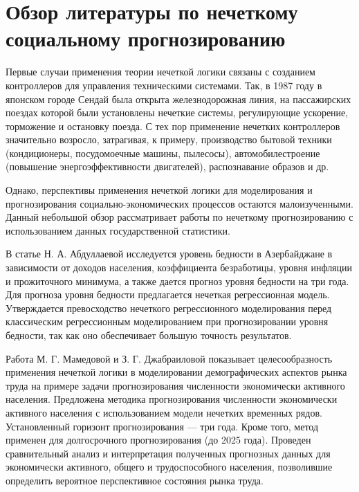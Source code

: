 \section{Обзор литературы по нечеткому социальному прогнозированию}

Первые случаи применения теории нечеткой логики связаны с созданием контроллеров
для управления техническими системами. Так, в 1987 году в японском городе Сендай
была открыта железнодорожная линия, на пассажирских поездах которой были
установлены нечеткие системы, регулирующие ускорение, торможение и остановку
поезда. С тех пор применение нечетких контроллеров значительно возросло,
затрагивая, к примеру, производство бытовой техники (кондиционеры, посудомоечные
машины, пылесосы), автомобилестроение (повышение энергоэффективности
двигателей), распознавание образов и др.

Однако, перспективы применения нечеткой логики для моделирования и
прогнозирования социально-экономических процессов остаются малоизученными.
Данный небольшой обзор рассматривает работы по нечеткому прогнозированию с
использованием данных государственной статистики. 

В статье  Н. А. Абдуллаевой \cite{Abdullaeva2010} исследуется уровень бедности в
Азербайджане в зависимости от доходов населения, коэффициента безработицы,
уровня инфляции и прожиточного минимума, а также дается прогноз уровня бедности
на три года. Для прогноза уровня бедности предлагается нечеткая регрессионная
модель. Утверждается превосходство нечеткого регрессионного моделирования перед
классическим регрессионным моделированием при прогнозировании уровня бедности,
так как оно обеспечивает большую точность результатов. 

Работа М. Г. Мамедовой и З. Г. Джабраиловой \cite{Mamedova2005} показывает
целесообразность применения нечеткой логики в моделировании демографических
аспектов рынка труда на примере задачи прогнозирования численности экономически
активного населения. Предложена методика прогнозирования численности
экономически активного населения с использованием модели нечетких временных
рядов. Установленный горизонт прогнозирования --- три года. Кроме того, метод
применен для долгосрочного прогнозирования (до 2025 года). Проведен
сравнительный анализ и интерпретация полученных прогнозных данных для
экономически активного, общего и трудоспособного населения, позволившие
определить вероятное перспективное состояния рынка труда. 


